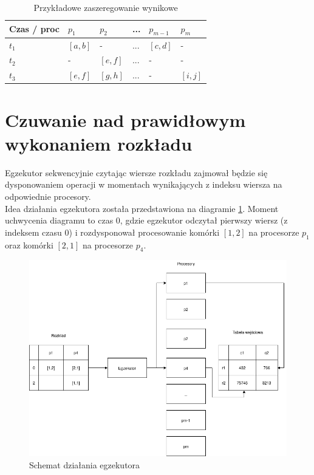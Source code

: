 \documentclass[brudnopis]{xmgr}
\begin{document}
\begin{table}[!tbh]
\begin{tabular}{|l|l|l|l|l|l|} \hline
Czas / proc & $p_1$     & $p_2$     & ...   & $p_{m-1}$ & $p_{m}$ \\ \hline
$t_1$       & $[a,b]$   & -         & ...   & $[c,d]$   & - \\ \hline
$t_2$       & -         & $[e,f]$   & ...   & -         & - \\ \hline
$t_3$       & $[e,f]$   & $[g,h]$   & ...   & -         & $[i,j]$\\ \hline
\end{tabular}
\caption{Przykładowe zaszeregowanie wynikowe\label{tab:example-sched-out}}
\end{table}

\section{Czuwanie nad prawidłowym wykonaniem rozkładu}

Egzekutor sekwencyjnie czytając wiersze rozkładu zajmował będzie się dysponowaniem operacji w momentach wynikających z indeksu wiersza na odpowiednie procesory.
\medskip\\

Idea działania egzekutora została przedstawiona na diagramie \ref{diag:executor}. Moment uchwycenia diagramu 
to czas 0, gdzie egzekutor odczytał pierwszy wiersz (z indeksem czasu 0) i rozdysponował procesowanie komórki $[1,2]$ na procesorze $p_1$ oraz komórki $[2,1]$ na procesorze $p_4$.
\medskip\\

\begin{figure}[!tbh]
\centering
\includegraphics[width=.8\hsize]{fig/executor.png}
\caption{Schemat działania egzekutora\label{diag:executor}}
\end{figure}
\medskip\\
\end{document}
